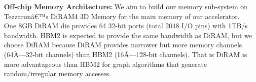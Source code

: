 \noindent
\textbf{Off-chip Memory Architecture:} 
We aim to build our memory sub-system on Tezzaronâ€™s DiRAM4 3D Memory for the main memory of our accelerator. 
One 8GB DiRAM die provides 64 32-bit ports (total 2048 I/O pins) with 1TB/s bandwidth. 
HBM2 is expected to provide the same bandwidth as DiRAM, but we choose DiRAM because DiRAM provides narrower but more memory channels (64Ã—32-bit channels) than HBM2 (16Ã—128-bit channels). 
That is DiRAM is more advantageous than HBM2 for graph algorithms that generate random/irregular memory accesses. 

